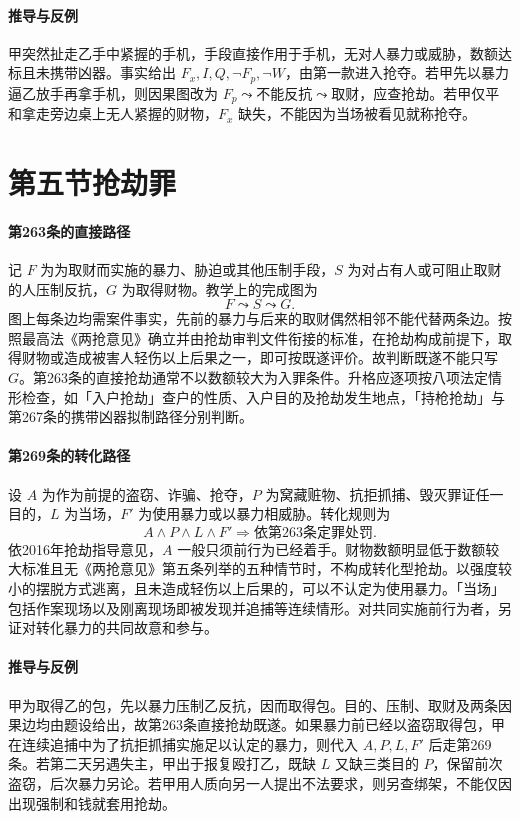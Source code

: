 \paragraph{推导与反例}
甲突然扯走乙手中紧握的手机，手段直接作用于手机，无对人暴力或威胁，数额达标且未携带凶器。事实给出 $F_x,I,Q,\neg F_p,\neg W$，由第一款进入抢夺。若甲先以暴力逼乙放手再拿手机，则因果图改为 $F_p\leadsto\text{不能反抗}\leadsto\text{取财}$，应查抢劫。若甲仅平和拿走旁边桌上无人紧握的财物，$F_x$ 缺失，不能因为当场被看见就称抢夺。

\section{第五节\quad 抢劫罪}

\paragraph{第263条的直接路径}
记 $F$ 为为取财而实施的暴力、胁迫或其他压制手段，$S$ 为对占有人或可阻止取财的人压制反抗，$G$ 为取得财物。教学上的完成图为
\[
 F\leadsto S\leadsto G .
\]
图上每条边均需案件事实，先前的暴力与后来的取财偶然相邻不能代替两条边。按照最高法《两抢意见》确立并由抢劫审判文件衔接的标准，在抢劫构成前提下，取得财物或造成被害人轻伤以上后果之一，即可按既遂评价。故判断既遂不能只写 $G$。第263条的直接抢劫通常不以数额较大为入罪条件。升格应逐项按八项法定情形检查，如「入户抢劫」查户的性质、入户目的及抢劫发生地点，「持枪抢劫」与第267条的携带凶器拟制路径分别判断。

\paragraph{第269条的转化路径}
设 $A$ 为作为前提的盗窃、诈骗、抢夺，$P$ 为窝藏赃物、抗拒抓捕、毁灭罪证任一目的，$L$ 为当场，$F'$ 为使用暴力或以暴力相威胁。转化规则为
\[
 A\land P\land L\land F'\Longrightarrow
 \text{依第263条定罪处罚}.
\]
依2016年抢劫指导意见，$A$ 一般只须前行为已经着手。财物数额明显低于数额较大标准且无《两抢意见》第五条列举的五种情节时，不构成转化型抢劫。以强度较小的摆脱方式逃离，且未造成轻伤以上后果的，可以不认定为使用暴力。「当场」包括作案现场以及刚离现场即被发现并追捕等连续情形。对共同实施前行为者，另证对转化暴力的共同故意和参与。

\paragraph{推导与反例}
甲为取得乙的包，先以暴力压制乙反抗，因而取得包。目的、压制、取财及两条因果边均由题设给出，故第263条直接抢劫既遂。如果暴力前已经以盗窃取得包，甲在连续追捕中为了抗拒抓捕实施足以认定的暴力，则代入 $A,P,L,F'$ 后走第269条。若第二天另遇失主，甲出于报复殴打乙，既缺 $L$ 又缺三类目的 $P$，保留前次盗窃，后次暴力另论。若甲用人质向另一人提出不法要求，则另查绑架，不能仅因出现强制和钱就套用抢劫。

